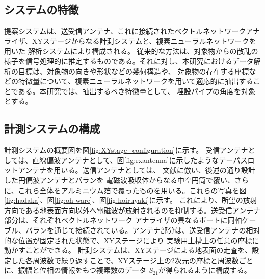 \documentclass[11pt,a4paper,uplatex]{ujarticle}
\begin{document}
  
  \subsection{システムの特徴}
    
    提案システムは、送受信アンテナ、これに接続されたベクトルネットワークアナライザ、XYステージからなる計測システムと、複素ニューラルネットワークを用いた
    解析システムにより構成される。
    従来的な方法は、対象物からの散乱の様子を信号処理的に推定するものである。それに対し、本研究におけるデータ解析の目標は、対象物の向きや形状などの幾何構造や、
    対象物の存在する座標などの特徴量について、複素ニューラルネットワークを用いて適応的に抽出することである。本研究では、抽出するべき特徴量として、
    埋設パイプの角度を対象とする。

  \subsection{計測システムの構成}

    計測システムの概要図を図\ref{fig:XYstage_configuration}に示す。
    受信アンテナとしては、直線偏波アンテナとして、図\ref{fig:rxantenna}に示したようなテーパスロットアンテナを用いる。送信アンテナとしては、
    文献\cite{absorbing_material}に倣い、後述の通り設計した円偏波アンテナとバランを
    電磁波吸収体からなる中空円筒で覆い、さらに、これら全体をアルミニウム箔で覆ったものを用いる。これらの写真を図\ref{fig:hadaka}、図\ref{fig:oh-ware}、図\ref{fig:hoiruyaki}に示す。
    これにより、所望の放射方向である地表面方向以外へ電磁波が放射されるのを抑制する。送受信アンテナ部分は、それぞれベクトルネットワーク
    アナライザの異なるポートに同軸ケーブル、バランを通じて接続されている。アンテナ部分は、送受信アンテナの相対的な位置が固定された状態で、XYステージにより
    実験用土槽上の任意の座標に動かすことができる。
    計測システムは、XYステージによる地表面の走査を、設定した各周波数で繰り返すことで、XYステージ上の2次元の座標と周波数ごとに、振幅と位相の情報をもつ複素数のデータ
    $S_{21}$が得られるように構成する。
\end{document}
